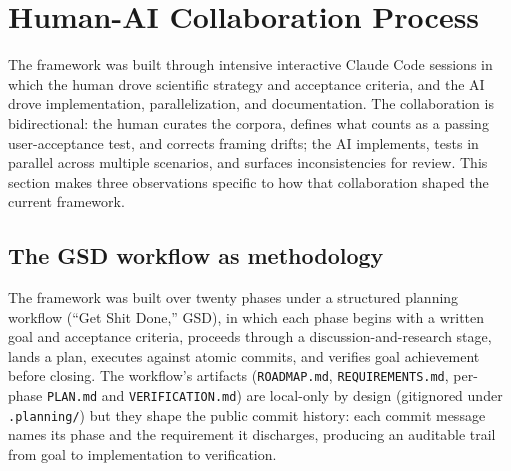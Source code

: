 \section{Human-AI Collaboration Process}
\label{sec:collaboration}

The framework was built through intensive interactive Claude Code sessions in which the human drove scientific strategy and acceptance criteria, and the AI drove implementation, parallelization, and documentation. The collaboration is bidirectional: the human curates the corpora, defines what counts as a passing user-acceptance test, and corrects framing drifts; the AI implements, tests in parallel across multiple scenarios, and surfaces inconsistencies for review. This section makes three observations specific to how that collaboration shaped the current framework.

\subsection{The GSD workflow as methodology}

The framework was built over twenty phases under a structured planning workflow (``Get Shit Done,'' GSD), in which each phase begins with a written goal and acceptance criteria, proceeds through a discussion-and-research stage, lands a plan, executes against atomic commits, and verifies goal achievement before closing. The workflow's artifacts (\texttt{ROADMAP.md}, \texttt{REQUIREMENTS.md}, per-phase \texttt{PLAN.md} and \texttt{VERIFICATION.md}) are local-only by design (gitignored under \texttt{.planning/}) but they shape the public commit history: each commit message names its phase and the requirement it discharges, producing an auditable trail from goal to implementation to verification.

